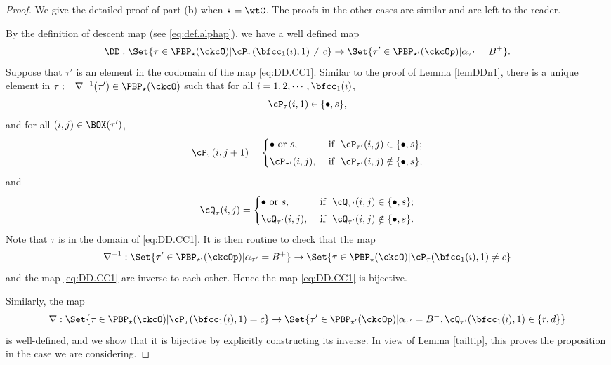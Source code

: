 \documentclass[ssunip]{subfiles}
\begin{document}
\begin{proof}
  We give the detailed proof of part (b) when $\star=\wtC$.
  The proofs in the other  cases are similar and are left to the reader.

By the definition of descent map (see \eqref{eq:def.alphap}), we have a well
defined map%
\begin{equation}\label{eq:DD.CC1}
\DD: \Set{\tau\in \PBP_{\star}(\ckcO)| \cP_\tau(\bfcc_{1}(\imath),1)\neq c}\rightarrow \Set{\tau'\in \PBP_{\star'}(\ckcOp)|  \alpha_{\tau'}=B^+}.
\end{equation}
Suppose that $\tau'$ is an element  in the codomain of the map \eqref{eq:DD.CC1}. Similar to the proof of Lemma \ref{lemDDn1}, there is a unique element in $\tau:=\nabla^{-1}(\tau')\in \PBP_{\star}(\ckcO)$ such that
for all $i=1,2, \cdots,\bfcc_{1}(\imath)$,
\[
  \cP_{\tau}(i,1)\in \{\bullet, s\},
\]
and
for all $(i,j)\in \BOX(\tau')$,
\[
     \cP_\tau(i,j+1)=\begin{cases}
    \bullet \textrm{ or } s,&\textrm{ if  $\ \cP_{\tau'}(i,j)\in \{\bullet, s\}$;} \smallskip \\
  \cP_{\tau'}(i,j),& \textrm{ if $\ \cP_{\tau'}(i,j)\notin \{\bullet, s\}$},\end{cases}
\]
 and
 \[
     \cQ_\tau(i,j)=\begin{cases}
    \bullet \textrm{ or } s,&\textrm{ if  $\ \cQ_{\tau'}(i,j)\in \{\bullet, s\}$;} \smallskip \\
  \cQ_{\tau'}(i,j), & \textrm{ if $\ \cQ_{\tau'}(i,j)\notin \{\bullet, s\}$}.  \end{cases}
\]
Note that $\tau$ is in the domain of \eqref{eq:DD.CC1}. It is then routine to check that the map
\[
  \nabla^{-1}: \Set{\tau'\in \PBP_{\star'}(\ckcOp)|  \alpha_{\tau'}=B^+}
  \rightarrow  \Set{\tau\in \PBP_{\star}(\ckcO)| \cP_\tau(\bfcc_{1}(\imath),1)\neq c}
\]
and the map \eqref{eq:DD.CC1} are inverse to each other. Hence the map \eqref{eq:DD.CC1} is bijective.

\smallskip

Similarly, the map
\[
  \nabla: \Set{\tau\in \PBP_{\star}(\ckcO)| \cP_\tau(\bfcc_{1}(\imath),1)= c}
  \rightarrow \Set{\tau'\in \PBP_{\star'}(\ckcOp)| \alpha_{\tau'}=B^-, \cQ_{\tau'}(\bfcc_{1}(\imath),1)\in\{r,d\}}
\]
is well-defined, and we show that it is bijective by explicitly  constructing its inverse. In view of Lemma \ref{tailtip}, this proves the proposition in the case we are considering.


\end{proof}
\end{document}
